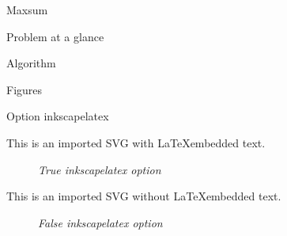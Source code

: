 \begin{chapter}{Maxsum}
    \begin{section}{Problem at a glance}
        \par
    \end{section}
    \begin{section}{Algorithm}
        \par
    \end{section}
    \newpage
    \begin{section}{Figures}
        \begin{subsection}{Option inkscapelatex}
            \par This is an imported SVG with \LaTeX embedded text.
            \begin{figure}[ht]
                \centering
                
                \caption{\emph{True inkscapelatex option}}
                \label{fig:latexembedded}
            \end{figure}
            \par This is an imported SVG without \LaTeX embedded text.
            \begin{figure}[ht]
                \centering
                
                \caption{\emph{False inkscapelatex option}}
                \label{fig:latexnotembedded}
            \end{figure}
        \end{subsection}
    \end{section}
\end{chapter}